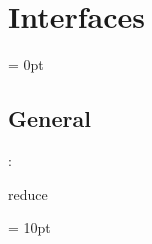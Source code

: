
\section{Interfaces} 


\parskip = 0pt

\vspace{3mm} \subsection*{General}

: 

reduce
\vspace{2mm}

\vspace{5mm}\parskip = 10pt 
